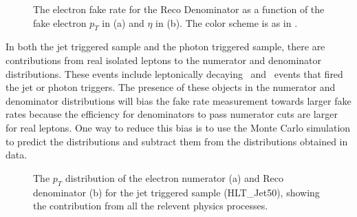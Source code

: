 \documentclass{cmspaper}
\begin{document}
\begin{figure}[htb]
  \begin{center}
    
    \caption{The electron fake rate for the Reco Denominator as a function of the fake electron $p_T$ in (a) and $\eta$ in (b). The color  scheme is as in .}
    \label{fig:electronFakeRate_Reco}
  \end{center}
\end{figure}

\label{sec:signalcontamination_electron}
In both the jet triggered sample and the photon triggered sample, there are contributions from real isolated leptons to the numerator and denominator distributions. These events include leptonically decaying \WPM\ and \Z\ events that fired the jet or photon triggers. The presence of these objects in the numerator and denominator distributions will bias the fake rate measurement towards larger fake rates because the efficiency for denominators to pass numerator cuts are larger for real leptons. One way to reduce this bias is to use the Monte Carlo simulation to predict the distributions and subtract them from the distributions obtained in data. 

\begin{figure}[htb]
  \begin{center}
    
    \caption{The $p_T$ distribution of the electron numerator (a) and Reco denominator (b) for the jet triggered sample (HLT\_Jet50), showing the contribution from all the relevent physics processes.}
    \label{fig:electronNumeratorDenominatorStacked_JetTriggeredSampleSeparate}
  \end{center}
\end{figure}
\end{document}
